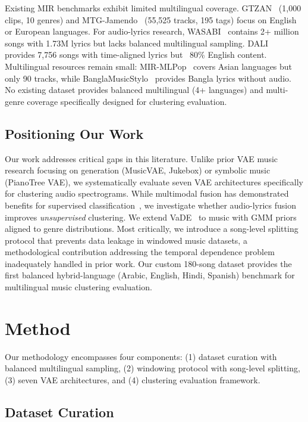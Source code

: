 \documentclass[10pt,twocolumn]{article}
\begin{document}
Existing MIR benchmarks exhibit limited multilingual coverage. GTZAN~\cite{tzanetakis2002musical} (1,000 clips, 10 genres) and MTG-Jamendo~\cite{bogdanov2019mtg} (55,525 tracks, 195 tags) focus on English or European languages. For audio-lyrics research, WASABI~\cite{buffa2021wasabi} contains 2+ million songs with 1.73M lyrics but lacks balanced multilingual sampling. DALI~\cite{meseguer2020dali} provides 7,756 songs with time-aligned lyrics but ~80\% English content. Multilingual resources remain small: MIR-MLPop~\cite{wang2024mir} covers Asian languages but only 90 tracks, while BanglaMusicStylo~\cite{hossain2018banglastyle} provides Bangla lyrics without audio. No existing dataset provides balanced multilingual (4+ languages) and multi-genre coverage specifically designed for clustering evaluation.

\subsection{Positioning Our Work}

Our work addresses critical gaps in this literature. Unlike prior VAE music research focusing on generation (MusicVAE, Jukebox) or symbolic music (PianoTree VAE), we systematically evaluate seven VAE architectures specifically for clustering audio spectrograms. While multimodal fusion has demonstrated benefits for supervised classification~\cite{pyrovolakis2022emotion}, we investigate whether audio-lyrics fusion improves \emph{unsupervised} clustering. We extend VaDE~\cite{jiang2017variational} to music with GMM priors aligned to genre distributions. Most critically, we introduce a song-level splitting protocol that prevents data leakage in windowed music datasets, a methodological contribution addressing the temporal dependence problem inadequately handled in prior work. Our custom 180-song dataset provides the first balanced hybrid-language (Arabic, English, Hindi, Spanish) benchmark for multilingual music clustering evaluation.

\section{Method}
\label{sec:method}

Our methodology encompasses four components: (1) dataset curation with balanced multilingual sampling, (2) windowing protocol with song-level splitting, (3) seven VAE architectures, and (4) clustering evaluation framework.

\subsection{Dataset Curation}
\end{document}
